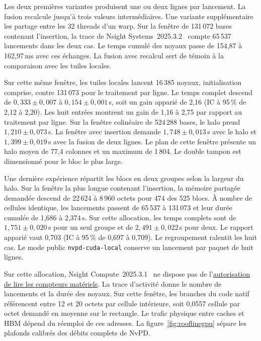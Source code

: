 Les deux premières variantes produisent une ou deux lignes par lancement. La fusion recalcule jusqu'à trois valeurs intermédiaires. Une variante supplémentaire les partage entre les 32 threads d'un warp. Sur la fenêtre de 131\,072 bases contenant l’insertion, la trace de Nsight Systems~2025.3.2~\cite{nsysdocs} compte 65\,537 lancements dans les deux cas. Le temps cumulé des noyaux passe de 154,87 à 162,97\,ms avec ces échanges. La fusion avec recalcul sert de témoin à la comparaison avec les tuiles locales.

Sur cette même fenêtre, les tuiles locales lancent 16\,385 noyaux, initialisation comprise, contre 131\,073 pour le traitement par ligne. Le temps complet descend de \(0{,}333\pm0{,}007\) à \(0{,}154\pm0{,}001\)\,s, soit un gain apparié de 2,16 (IC à 95\,\% de 2,12 à 2,20). Les huit entrées montrent un gain de 1,16 à 2,75 par rapport au traitement par ligne. Sur la fenêtre colinéaire de 524\,288 bases, le halo prend \(1{,}210\pm0{,}073\)\,s. La fenêtre avec insertion demande \(1{,}748\pm0{,}013\)\,s avec le halo et \(1{,}399\pm0{,}019\)\,s avec la fusion de deux lignes. Le plan de cette fenêtre présente un halo moyen de 77,4 colonnes et un maximum de 1\,804. Le double tampon est dimensionné pour le bloc le plus large.

Une dernière expérience répartit les blocs en deux groupes selon la largeur du halo. Sur la fenêtre la plus longue contenant l’insertion, la mémoire partagée demandée descend de 22\,624 à 8\,960 octets pour 474 des 525 blocs. À nombre de cellules identique, les lancements passent de 65\,537 à 131\,073 et leur durée cumulée de 1,686 à 2,374\,s. Sur cette allocation, les temps complets sont de \(1{,}751\pm0{,}020\)\,s pour un seul groupe et de \(2{,}491\pm0{,}022\)\,s pour deux. Le rapport apparié vaut 0,703 (IC à 95\,\% de 0,697 à 0,709). Le regroupement ralentit les huit cas. Le mode public \texttt{nvpd-cuda-local} conserve un lancement par paquet de huit lignes.

Sur cette allocation, Nsight Compute~2025.3.1~\cite{ncudocs} ne dispose pas de l’\href{https://developer.nvidia.com/ERR_NVGPUCTRPERM}{autorisation de lire les compteurs matériels}. La trace d’activité donne le nombre de lancements et la durée des noyaux. Sur cette fenêtre, les branches du code natif référencent entre 12 et 20 octets par cellule intérieure, soit 0,0557 cellule par octet demandé en moyenne sur le rectangle. Le trafic physique entre caches et HBM dépend du réemploi de ces adresses. La figure~\ref{fig:rooflinegpu} sépare les plafonds calibrés des débits complets de NvPD.

